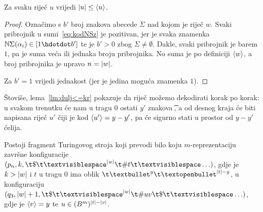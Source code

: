 \begin{lema}[{name=[duljina riječi nije veća od koda riječi]}]\label{lm:dulj<=kr}
Za svaku riječ $u$ vrijedi $\lvert u\rvert\le\langle u\rangle$.
\end{lema}
\begin{proof}
Označimo s $b'$ broj znakova abecede $\Sigma$ nad kojom je riječ $w$.
Svaki pribrojnik u sumi~\eqref{eq:kodNSz} je pozitivan, jer je svaka znamenka $\N\Sigma(\alpha_i)\in[1\dd b']$ te je $b'>0$ zbog $\Sigma\ne\emptyset$. Dakle, svaki pribrojnik je barem $1$, pa je suma veća ili jednaka broju pribrojnika. No suma je po definiciji $\langle w\rangle$, a broj pribrojnika je upravo $n=\lvert w\rvert$.

Za $b'=1$ vrijedi jednakost (jer je jedina moguća znamenka $1$).
\end{proof}

Štoviše, lema~\ref{lm:dulj<=kr} pokazuje da riječ možemo dekodirati korak po korak: u svakom trenutku će nam u tragu $0$ ostati $y'$ znakova \t\textbullet, a od desnog kraja će biti napisana riječ $u'$ čiji je kod $\langle u'\rangle=y-y'$, pa će sigurno stati u prostor od $y-y'$ ćelija.

\begin{lema}[{name=[četvrti fragment transpiliranog stroja]}]\label{lm:faza4}
Postoji fragment Turingovog stroja koji prevodi bilo koju $m$-reprezentaciju završne konfiguracije $(p_n,k,\t\$\bl^{\dulj w}\t\#t\bl\ldots)$, gdje je $k>\lvert w\rvert$ i $t$ u tragu $0$ ima oblik $\t\textbullet^y\t\textopenbullet^{\dulj t-y}$, u konfiguraciju $(q_3,\dulj w+1,\t\$\bl^{\dulj w}\t\#uv\t\$\bl\ldots)$, gdje je $\langle v\rangle=y$ te $u\in(B^m)^{\lvert t\rvert-\lvert v\rvert}$.
\end{lema}

